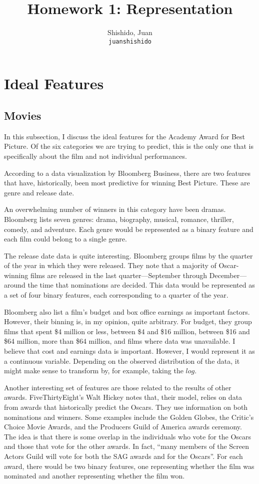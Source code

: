 \documentclass[11pt]{article}
\title{Homework 1: Representation}
\author{
  Shishido, Juan\\
  \texttt{juanshishido}
}
\begin{document}
\maketitle

\section{Ideal Features}

\subsection{Movies}

In this subsection, I discuss the ideal features for the Academy Award for Best 
Picture. Of the six categories we are trying to predict, this is the only one
that is specifically about the film and not individual performances.

According to a data visualization by Bloomberg Business\cite{bloomberg}, there
are two features that have, historically, been most predictive for winning
Best Picture. These are genre and release date.

An overwhelming number of winners in this category have been dramas. Bloomberg
lists seven genres: drama, biography, musical, romance, thriller, comedy, and
adventure. Each genre would be represented as a binary feature and each film
could belong to a single genre.

The release date data is quite interesting. Bloomberg groups films by the
quarter of the year in which they were released. They note that a majority of
Oscar-winning films are released in the last quarter---September through
December---around the time that nominations are decided. This data would be
represented as a set of four binary features, each corresponding to a quarter
of the year.

Bloomberg also list a film's budget and box office earnings as important
factors. However, their binning is, in my opinion, quite arbitrary. For budget,
they group films that spent \$4 million or less, between \$4 and \$16 million, 
between \$16 and \$64 million, more than \$64 million, and films where data was
unavailable. I believe that cost and earnings data is important. However, I
would represent it as a continuous variable. Depending on the observed
distribution of the data, it might make sense to transform by, for example,
taking the $log$.

Another interesting set of features are those related to the results of other
awards. FiveThirtyEight's Walt Hickey notes that, their model, relies on data
from awards that historically predict the Oscars\cite{fivethirtyeight-guide}.
They use information on both nominations and winners. Some examples include the
Golden Globes, the Critic's Choice Movie Awards, and the Producers Guild of
America awards ceremony. The idea is that there is some overlap in the
individuals who vote for the Oscars and those that vote for the other awards.
In fact, ``many members of the Screen Actors Guild will vote for both the SAG
awards and for the Oscars''\cite{fivethirtyeight-election}. For each award,
there would be two binary features, one representing whether the film was
nominated and another representing whether the film won.
\end{document}
